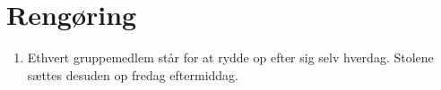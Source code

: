 \section{Rengøring}
\begin{enumerate}
\item{Ethvert gruppemedlem står for at rydde op efter sig selv hverdag. Stolene sættes desuden op
fredag eftermiddag.}
\end{enumerate}
